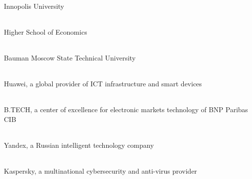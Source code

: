 \cleardoublepage
{}

\newcommand\partner[3]{ \\ #3}

\partner{height=0.7in}{partners/iu}{Innopolis University}

\partner{height=0.8in}{partners/hse}{Higher School of Economics}

\partner{height=0.8in}{partners/bauman}{Bauman Moscow State Technical University}

\partner{height=0.5in}{partners/huawei}{Huawei, a global provider of ICT infrastructure and smart devices}

\partner{width=0.7in}{partners/bnp}{B.TECH, a center of excellence for electronic markets technology of BNP Paribas CIB}

\partner{width=1.2in}{partners/yandex}{Yandex, a Russian intelligent technology company}

\partner{width=2in}{partners/kaspersky}{Kaspersky, a multinational cybersecurity and anti-virus provider}
